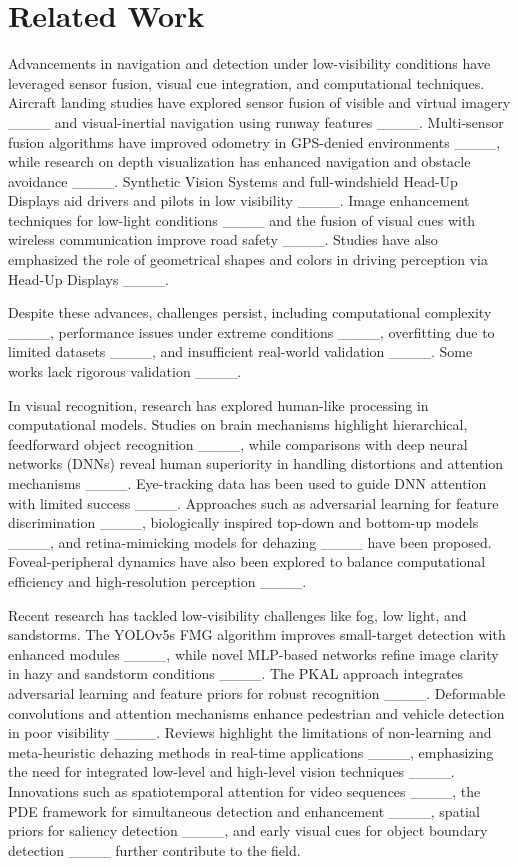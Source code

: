 \section{Related Work}
\label{sec:related_work}
Advancements in navigation and detection under low-visibility conditions have leveraged sensor fusion, visual cue integration, and computational techniques. Aircraft landing studies have explored sensor fusion of visible and virtual imagery ____ and visual-inertial navigation using runway features ____. Multi-sensor fusion algorithms have improved odometry in GPS-denied environments ____, while research on depth visualization has enhanced navigation and obstacle avoidance ____. Synthetic Vision Systems and full-windshield Head-Up Displays aid drivers and pilots in low visibility ____. Image enhancement techniques for low-light conditions ____ and the fusion of visual cues with wireless communication improve road safety ____. Studies have also emphasized the role of geometrical shapes and colors in driving perception via Head-Up Displays ____.

Despite these advances, challenges persist, including computational complexity ____, performance issues under extreme conditions ____, overfitting due to limited datasets ____, and insufficient real-world validation ____. Some works lack rigorous validation ____.

In visual recognition, research has explored human-like processing in computational models. Studies on brain mechanisms highlight hierarchical, feedforward object recognition ____, while comparisons with deep neural networks (DNNs) reveal human superiority in handling distortions and attention mechanisms ____. Eye-tracking data has been used to guide DNN attention with limited success ____. Approaches such as adversarial learning for feature discrimination ____, biologically inspired top-down and bottom-up models ____, and retina-mimicking models for dehazing ____ have been proposed. Foveal-peripheral dynamics have also been explored to balance computational efficiency and high-resolution perception ____.

Recent research has tackled low-visibility challenges like fog, low light, and sandstorms. The YOLOv5s FMG algorithm improves small-target detection with enhanced modules ____, while novel MLP-based networks refine image clarity in hazy and sandstorm conditions ____. The PKAL approach integrates adversarial learning and feature priors for robust recognition ____. Deformable convolutions and attention mechanisms enhance pedestrian and vehicle detection in poor visibility ____. Reviews highlight the limitations of non-learning and meta-heuristic dehazing methods in real-time applications ____, emphasizing the need for integrated low-level and high-level vision techniques ____. Innovations such as spatiotemporal attention for video sequences ____, the PDE framework for simultaneous detection and enhancement ____, spatial priors for saliency detection ____, and early visual cues for object boundary detection ____ further contribute to the field.

